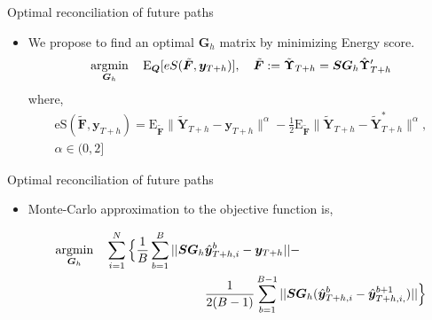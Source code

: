 \documentclass[11pt,xcolor=dvipsnames,handout]{beamer}
\def\E{\text{E}}
\begin{document}
\begin{frame}{Optimal reconciliation of future paths}
\begin{itemize}[<+-| alert@+>]
\item We propose to find an optimal $\bm{G}_h$ matrix by minimizing Energy score. 
\begin{equation*}
\operatornamewithlimits{argmin}_{\bm{G}_h} \quad \E_{\bm{Q}}[eS(\tilde{\bm{F}}, \bm{y}_{T+h})], \quad  \tilde{\bm{F}} := \tilde{\bm{\Upsilon}}_{T+h} = \bm{SG}_h\hat{\bm{\Upsilon}}'_{T+h}
\end{equation*}
where, \begin{align*}
\text{eS}(\tilde{\bm{F}},\bm{y}_{T+h}) = 
\E_{\tilde{\bm{F}}}
\|\tilde{\bm{Y}}_{T+h}-\bm{y}_{T+h}\|^\alpha -
\frac{1}{2}\E_{\tilde{\bm{F}}}\|\tilde{\bm{Y}}_{T+h}-\tilde{\bm{Y}}^*_{T+h}\|^\alpha,\\ \alpha \in (0,2]
\end{align*}

\end{itemize}
\end{frame}

\begin{frame}{Optimal reconciliation of future paths}
\begin{itemize}[<+-| alert@+>]
	
	\item Monte-Carlo approximation to the objective function is, 
	\begin{block}{}
		\begin{align*}
		\operatornamewithlimits{argmin}_{\bm{G}_h} \quad \sum_{i=1}^{N}\Big\{\frac{1}{B}\sum_{b=1}^{B}||\bm{SG}_h&\hat{\bm{y}}_{T+h,i}^b -\bm{y}_{T+h}||-\\
		&\frac{1}{2(B-1)}\sum_{b=1}^{B-1}||\bm{SG}_h(\hat{\bm{y}}_{T+h,i}^b -\hat{\bm{y}}_{T+h,i,}^{b+1})||\Big\}
		\end{align*}
	\end{block}
\end{itemize}
\end{frame}
\end{document}
